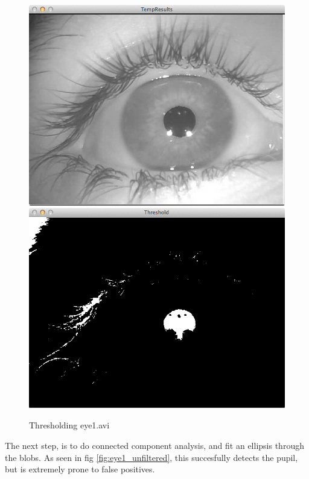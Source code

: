 \documentclass[a4paper,11pt]{article}
\begin{document}
\begin{figure}[ht]
  \centering
  \includegraphics[scale=0.2]{eye1}
  \includegraphics[scale=0.2]{eye1_threshold_93}
  \caption{Thresholding eye1.avi}
  \label{fig:eye1_threshold_93}
\end{figure}

The next step, is to do connected component analysis, and fit an ellipsis through the blobs. As seen in fig \ref{fig:eye1_unfiltered}, this succesfully detects the pupil, but is extremely prone to false positives.
\end{document}
